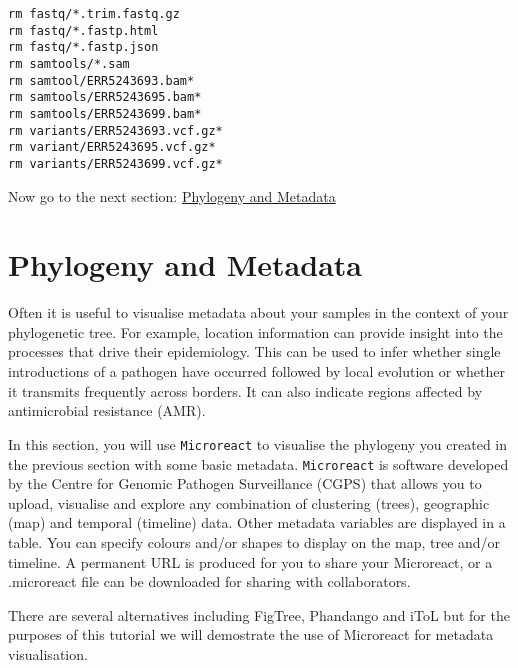 \documentclass[11pt]{article}
\makeatletter
\newcommand{\boxspacing}{\kern\kvtcb@left@rule\kern\kvtcb@boxsep}
\newcommand{\prompt}[4]{
        {
        \ttfamily\llap{{\color{blue}\LARGE\faKeyboardO\hspace{3pt}#4}}\vspace{-\baselineskip}
	}
    }
\makeatother
\begin{document}
    \begin{tcolorbox}[breakable, size=fbox, boxrule=1pt, pad at break*=1mm,colback=cellbackground, colframe=cellborder]
\prompt{In}{incolor}{ }{\boxspacing}
\begin{Verbatim}[commandchars=\\\{\}]
rm fastq/*.trim.fastq.gz
rm fastq/*.fastp.html
rm fastq/*.fastp.json
rm samtools/*.sam
rm samtool/ERR5243693.bam*
rm samtools/ERR5243695.bam*
rm samtools/ERR5243699.bam*
rm variants/ERR5243693.vcf.gz*
rm variant/ERR5243695.vcf.gz*
rm variants/ERR5243699.vcf.gz*
\end{Verbatim}
\end{tcolorbox}

    Now go to the next section: \href{metadata.ipynb}{Phylogeny and
Metadata}





\newpage





    \hypertarget{phylogeny-and-metadata}{%
\section{Phylogeny and Metadata}\label{phylogeny-and-metadata}}

Often it is useful to visualise metadata about your samples in the
context of your phylogenetic tree. For example, location information can
provide insight into the processes that drive their epidemiology. This
can be used to infer whether single introductions of a pathogen have
occurred followed by local evolution or whether it transmits frequently
across borders. It can also indicate regions affected by antimicrobial
resistance (AMR).

In this section, you will use \texttt{Microreact} to visualise the
phylogeny you created in the previous section with some basic metadata.
\texttt{Microreact} is software developed by the Centre for Genomic
Pathogen Surveillance (CGPS) that allows you to upload, visualise and
explore any combination of clustering (trees), geographic (map) and
temporal (timeline) data. Other metadata variables are displayed in a
table. You can specify colours and/or shapes to display on the map, tree
and/or timeline. A permanent URL is produced for you to share your
Microreact, or a .microreact file can be downloaded for sharing with
collaborators.

There are several alternatives including FigTree, Phandango and iToL but
for the purposes of this tutorial we will demostrate the use of
Microreact for metadata visualisation.
\end{document}
